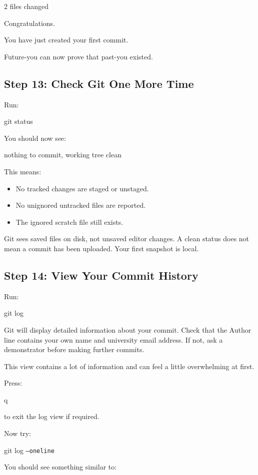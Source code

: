 \documentclass{csc2059practical}
\begin{document}
\begin{terminalplain}
2 files changed
\end{terminalplain}
Congratulations.

You have just created your first commit.

Future-you can now prove that past-you existed.

\subsection{Step 13: Check Git One More Time}
Run:

\begin{terminalplain}
git status
\end{terminalplain}
You should now see:

\begin{terminalplain}
nothing to commit, working tree clean
\end{terminalplain}
This means:

\begin{itemize}
  \item No tracked changes are staged or unstaged.
  \item No unignored untracked files are reported.
  \item The ignored scratch file still exists.
\end{itemize}
Git sees saved files on disk, not unsaved editor changes. A clean status does not mean a commit has been uploaded. Your first snapshot is local.
\subsection{Step 14: View Your Commit History}
Run:

\begin{terminalplain}
git log
\end{terminalplain}
Git will display detailed information about your commit. Check that the Author line contains your own name and university email address. If not, ask a demonstrator before making further commits.

This view contains a lot of information and can feel a little overwhelming at first.

Press:

\begin{terminalplain}
q
\end{terminalplain}
to exit the log view if required.

Now try:

\begin{terminalplain}
git log \texttt{--oneline}
\end{terminalplain}
You should see something similar to:
\end{document}
